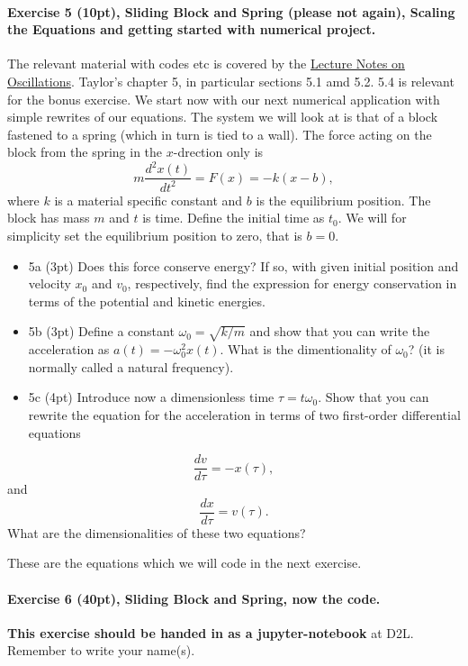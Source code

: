 \documentclass[%
oneside,                 %
final,                   %
10pt]{article}
\begin{document}
\paragraph{Exercise 5 (10pt), Sliding Block  and Spring (please not again), Scaling the Equations and getting started with numerical project.}
The relevant material with codes etc is covered by the \href{{https://mhjensen.github.io/Physics321/doc/pub/harmonic/html/harmonic.html}}{Lecture Notes on Oscillations}. Taylor's chapter 5, in particular sections 5.1 amd 5.2. 5.4 is relevant for the bonus exercise.
We start now with our next numerical application with simple rewrites of our equations. The system we will look at is that of a block fastened to a spring (which in turn is tied to a wall).
The force acting on the block from the spring in the $x$-drection only is
\[
m\frac{d^2x(t)}{dt^2}=F(x) = -k(x-b),
\]
where $k$ is a material specific constant and $b$ is the equilibrium position. The block has mass $m$ and $t$ is time. Define the initial time as $t_0$. We will for simplicity set the equilibrium position to zero, that is $b=0$.

\begin{itemize}
\item 5a (3pt) Does this force conserve energy? If so, with given initial position and velocity $x_0$ and $v_0$, respectively, find the expression for energy conservation in terms of the potential and kinetic energies.  

\item 5b (3pt) Define a constant $\omega_0=\sqrt{k/m}$ and show that you can write the acceleration as $a(t) = -\omega_0^2 x(t)$. What is the dimentionality of $\omega_0$? (it is normally called a natural frequency).  

\item 5c (4pt) Introduce now a dimensionless time $\tau = t\omega_0$. Show that you can rewrite the  equation for the acceleration in terms of two first-order differential equations
\end{itemize}

\noindent
\[
\frac{dv}{d\tau} = -x(\tau),
\]
and
\[
\frac{dx}{d\tau} = v(\tau).
\]
What are the dimensionalities of these two equations?

These are the equations which we will code in the next exercise.

\paragraph{Exercise 6 (40pt), Sliding Block  and Spring, now the code.}
\textbf{This exercise should be handed in as a jupyter-notebook} at D2L. Remember to write your name(s). 
\end{document}
